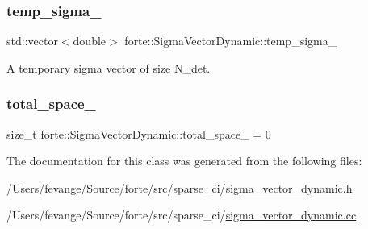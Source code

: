 \subsubsection{\texorpdfstring{temp\+\_\+sigma\+\_\+}{temp\_sigma\_}}
{\footnotesize\ttfamily std\+::vector$<$double$>$ forte\+::\+Sigma\+Vector\+Dynamic\+::temp\+\_\+sigma\+\_\+\hspace{0.3cm}{\ttfamily [protected]}}



A temporary sigma vector of size N\+\_\+det. 

\mbox{\label{classforte_1_1_sigma_vector_dynamic_ab539f0ab423f45b066cb8e38d768f9ca}} 
\subsubsection{\texorpdfstring{total\+\_\+space\+\_\+}{total\_space\_}}
{\footnotesize\ttfamily size\+\_\+t forte\+::\+Sigma\+Vector\+Dynamic\+::total\+\_\+space\+\_\+ = 0\hspace{0.3cm}{\ttfamily [protected]}}



The documentation for this class was generated from the following files\+:\begin{DoxyCompactItemize}
\item 
/\+Users/fevange/\+Source/forte/src/sparse\+\_\+ci/\mbox{\hyperlink{sigma__vector__dynamic_8h}{sigma\+\_\+vector\+\_\+dynamic.\+h}}\item 
/\+Users/fevange/\+Source/forte/src/sparse\+\_\+ci/\mbox{\hyperlink{sigma__vector__dynamic_8cc}{sigma\+\_\+vector\+\_\+dynamic.\+cc}}\end{DoxyCompactItemize}
